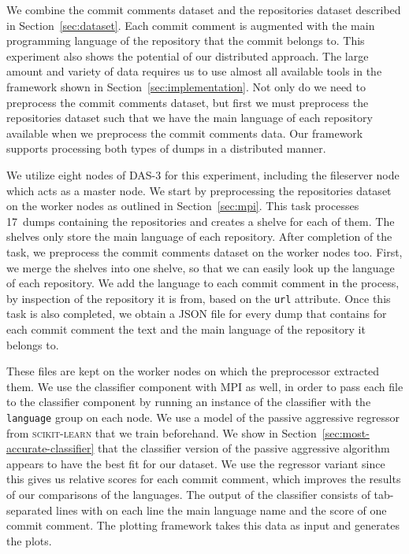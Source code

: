 \documentclass{article}
\begin{document}
We combine the commit comments dataset and the repositories dataset described 
in Section~\ref{sec:dataset}. Each commit comment is augmented with the main 
programming language of the repository that the commit belongs to. This 
experiment also shows the potential of our distributed approach. The large
amount and variety of data requires us to use almost all available tools in the
framework shown in Section~\ref{sec:implementation}. Not only do we need to
preprocess the commit comments dataset, but first we must preprocess the
repositories dataset such that we have the main language of each repository
available when we preprocess the commit comments data. Our framework supports
processing both types of dumps in a distributed manner.

We utilize eight nodes of DAS-3 for this experiment, including the fileserver 
node which acts as a master node. We start by preprocessing the repositories 
dataset on the worker nodes as outlined in Section~\ref{sec:mpi}. This task 
processes 17~dumps containing the repositories and creates a shelve for each of 
them. The shelves only store the main language of each repository. After 
completion of the task, we preprocess the commit comments dataset on the worker 
nodes too. First, we merge the shelves into one shelve, so that we can easily 
look up the language of each repository. We add the language to each commit 
comment in the process, by inspection of the repository it is from, based on 
the {\tt url} attribute. Once this task is also completed, we obtain a JSON 
file for every dump that contains for each commit comment the text and the main 
language of the repository it belongs to.

These files are kept on the worker nodes on which the preprocessor extracted 
them. We use the classifier component with MPI as well, in order to pass each 
file to the classifier component by running an instance of the classifier with 
the {\tt language} group on each node. We use a model of the passive aggressive 
regressor from \textsc{scikit-learn} that we train beforehand. We show in 
Section~\ref{sec:most-accurate-classifier} that the classifier version of the 
passive aggressive algorithm appears to have the best fit for our dataset. We 
use the regressor variant since this gives us relative scores for each commit 
comment, which improves the results of our comparisons of the languages. The
output of the classifier consists of tab-separated lines with on each line the 
main language name and the score of one commit comment. The plotting framework
takes this data as input and generates the plots.
\end{document}

